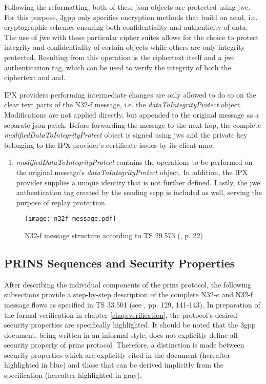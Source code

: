 Following the reformatting, both of these \gls{json} objects are protected using \gls{jwe}.
For this purpose, \gls{3gpp} only specifies encryption methods that build on \gls{aead}, i.e. cryptographic schemes ensuring both confidentiality and authenticity of data.
The use of \gls{jwe} with these particular cipher suites allows for the choice to protect integrity and confidentiality of certain objects while others are only integrity protected.
Resulting from this operation is the ciphertext itself and a \gls{jwe} authentication tag, which can be used to verify the integrity of both the ciphertext and \gls{aad}.

IPX providers performing intermediate changes are only allowed to do so on the clear text parts of the N32-f message, i.e. the \textit{dataToIntegrityProtect} object.
Modifications are not applied directly, but appended to the original message as a separate \gls{json} patch.
Before forwarding the message to the next hop, the complete \textit{modifiedDataToIntegrityProtect} object is signed using \gls{jws} and the private key belonging to the IPX provider's certificate issues by its client \gls{mno}.

\begin{enumerate}[label=--]
    \item \textit{modifiedDataToIntegrityProtect} contains the operations to be performed on the original message's \textit{dataToIntegrityProtect} object. In addition, the IPX provider supplies a unique identity that is not further defined. Lastly, the \gls{jwe} authentication tag created by the sending \gls{sepp} is included as well, serving the purpose of replay protection.
\end{enumerate}

\begin{figure}[h!]
    \centering
    \texttt{[image: n32f-message.pdf]}
    \caption{N32-f message structure according to TS 29.573 (\cite{3gpp.29.573}, p. 22)}
    \label{fig:n32f-message}
\end{figure}

\subsection{PRINS Sequences and Security Properties}
\label{ssec:prins-sequence}

After describing the individual components of the \gls{prins} protocol, the following subsections provide a step-by-step description of the complete N32-c and N32-f message flows as specified in TS 33.501 (see \cite{3gpp.33.501}, pp. 129, 141-143).
In preparation of the formal verification in chapter \ref{chap:verification}, the protocol's desired security properties are specifically highlighted.
It should be noted that the \gls{3gpp} document, being written in an informal style, does not explicitly define all security property of \gls{prins} protocol.
Therefore, a distinction is made between security properties which are explicitly cited in the document (hereafter highlighted in blue) and those that can be derived implicitly from the specification (hereafter highlighted in gray).

